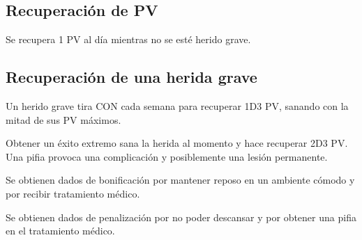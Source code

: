 \subsection{Recuperación de PV}

Se recupera 1 PV al día mientras no se esté herido grave.

\subsection{Recuperación de una herida grave}

Un herido grave tira CON cada semana para recuperar 1D3 PV, sanando con la mitad de sus PV máximos.

Obtener un éxito extremo sana la herida al momento y hace recuperar 2D3 PV. Una pifia provoca una complicación y posiblemente una lesión permanente.

Se obtienen dados de bonificación por mantener reposo en un ambiente cómodo y por recibir tratamiento médico.

Se obtienen dados de penalización por no poder descansar y por obtener una pifia en el tratamiento médico.